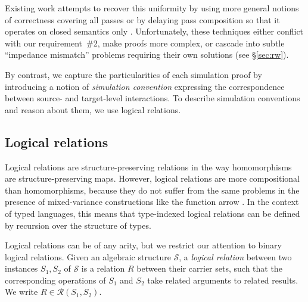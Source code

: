 \documentclass[sigplan,screen,review]{acmart}
\begin{document}
Existing work attempts to recover this uniformity
by using more general notions of correctness
covering all passes
\cite{compcompcert,compcertm}
or by delaying pass composition so that
it operates on closed semantics only
\cite{sepcompcert,compcertm}.
Unfortunately, these techniques either
conflict with our requirement~\#2,
make proofs more complex,
or cascade into subtle ``impedance mismatch'' problems
requiring their own solutions
(see \S\ref{sec:rw}).

By contrast,
we capture the particularities of each simulation proof
by introducing a notion of \emph{simulation convention}
expressing the correspondence between
source- and target-level interactions.
To describe simulation conventions
and reason about them,
we use logical relations.



\subsection{Logical relations} \label{sec:logrel} %

Logical relations are structure-preserving relations
in the way homomorphisms are structure-preserving maps.
However,
logical relations are more compositional than homomorphisms,
because they do not suffer from the same problems
in the presence of mixed-variance constructions
like the function arrow %
\cite{lrp}.
In the context of typed languages,
this means that type-indexed logical relations
can be defined by recursion over the structure of types.


Logical relations can be of any arity,
but
we restrict our attention to
binary logical relations.
Given an algebraic structure $\mathcal{S}$,
a \emph{logical relation}
between two instances $S_1, S_2$ of $\mathcal{S}$
is a relation $R$
between their carrier sets,
such that the corresponding operations of $S_1$ and $S_2$
take related arguments to related results.
We write $R \in \mathcal{R}(S_1, S_2)$.
\end{document}
